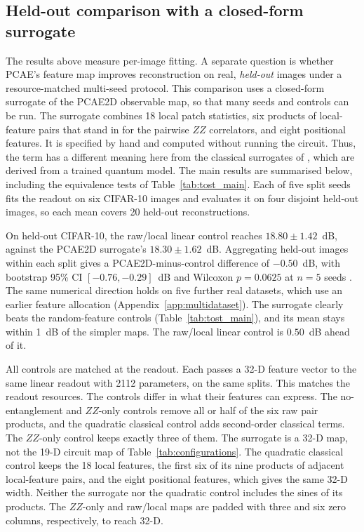 \documentclass[pdflatex,sn-basic]{sn-jnl}
\begin{document}
\subsection{Held-out comparison with a closed-form surrogate}
\label{sec:ablation_relationship}
The results above measure per-image fitting.
A separate question is whether PCAE's feature map improves reconstruction on real, \emph{held-out} images under a resource-matched multi-seed protocol.
This comparison uses a closed-form surrogate of the PCAE2D observable map, so that many seeds and controls can be run.
The surrogate combines 18 local patch statistics, six products of local-feature pairs that stand in for the pairwise $ZZ$ correlators, and eight positional features.
It is specified by hand and computed without running the circuit.
Thus, the term has a different meaning here from the classical surrogates of \citet{Schreiber2023}, which are derived from a trained quantum model.
The main results are summarised below, including the equivalence tests of Table~\ref{tab:tost_main}.
Each of five split seeds fits the readout on six CIFAR-10 images and evaluates it on four disjoint held-out images, so each mean covers 20 held-out reconstructions.

On held-out CIFAR-10, the raw/local linear control reaches $18.80\pm1.42$~dB, against the PCAE2D surrogate's $18.30\pm1.62$~dB.
Aggregating held-out images within each split gives a PCAE2D-minus-control difference of $-0.50$~dB, with bootstrap 95\% CI $[-0.76,-0.29]$~dB and Wilcoxon $p=0.0625$ at $n=5$ seeds \citep{Efron1993, Wilcoxon1945}.
The same numerical direction holds on five further real datasets, which use an earlier feature allocation (Appendix~\ref{app:multidataset}).
The surrogate clearly beats the random-feature controls (Table~\ref{tab:tost_main}), and its mean stays within 1~dB of the simpler maps.
The raw/local linear control is $0.50$~dB ahead of it.

All controls are matched at the readout.
Each passes a 32-D feature vector to the same linear readout with 2112 parameters, on the same splits.
This matches the readout resources.
The controls differ in what their features can express.
The no-entanglement and $ZZ$-only controls remove all or half of the six raw pair products, and the quadratic classical control adds second-order classical terms.
The $ZZ$-only control keeps exactly three of them.
The surrogate is a 32-D map, not the 19-D circuit map of Table~\ref{tab:configurations}.
The quadratic classical control keeps the 18 local features, the first six of its nine products of adjacent local-feature pairs, and the eight positional features, which gives the same 32-D width.
Neither the surrogate nor the quadratic control includes the sines of its products.
The $ZZ$-only and raw/local maps are padded with three and six zero columns, respectively, to reach 32-D.
\end{document}
